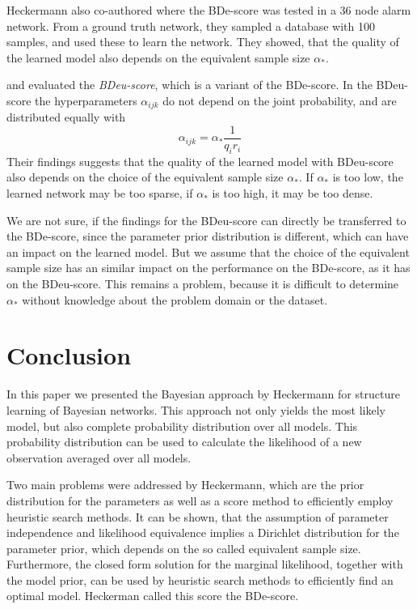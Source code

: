 \documentclass{article}
\begin{document}
Heckermann also co-authored \cite{prior_network} where the BDe-score was tested in a 36 node alarm network.
From a ground truth network, they sampled a database with 100 samples, and used these to learn
the network. They showed, that the quality of the learned model also depends on the equivalent
sample size $\alpha_*$.

\cite{MAP} and \cite{Bio} evaluated the \textit{BDeu-score}, which is a variant
of the BDe-score. In the BDeu-score the hyperparameters $\alpha_{ijk}$ do not depend on the joint
probability, and are distributed equally with
\[
	\alpha_{ijk} = \alpha_*\frac{1}{q_ir_i}
\]
Their findings suggests that the quality of the learned model with BDeu-score also depends on 
the choice of the equivalent sample size $\alpha_*$. If $\alpha_*$ is too low, the learned network
may be too sparse, if $\alpha_*$ is too high, it may be too dense. 

We are not sure, if the findings
for the BDeu-score can directly be transferred to the BDe-score, since the parameter prior distribution is
different, which can have an impact on the learned model. But we assume that the choice of the
equivalent sample size has an similar impact on the performance on the BDe-score, as it has on the BDeu-score. This remains a problem, because it is difficult to determine $\alpha_*$
without knowledge about the problem domain or the dataset. 

\section{Conclusion}
In this paper we presented the Bayesian approach by Heckermann \cite{original} for structure learning of
Bayesian networks. This approach not only yields the most likely model, but also complete
probability distribution over all models. This probability distribution can be used to calculate
the likelihood of a new observation averaged over all models.

Two main problems were addressed by Heckermann, which are the prior distribution for the parameters
as well as a score method to efficiently employ heuristic search methods. It can be shown, that
the assumption of parameter independence and likelihood equivalence implies a Dirichlet distribution
for the parameter prior, which depends on the so called equivalent sample size. Furthermore, the closed
form solution for the marginal likelihood, together with the model prior, can be used by heuristic
search methods to efficiently find an optimal model. Heckerman called this score the BDe-score.
\end{document}
